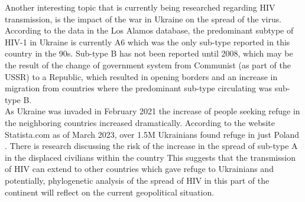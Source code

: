 Another interesting topic that is currently being researched regarding HIV transmission, is the impact of the war in Ukraine on the spread of the virus. 
According to the data in the Los Alamos database, the predominant subtype of HIV-1 in Ukraine is currently A6 which was the only sub-type reported in this country in the 90s.
Sub-type B has not been reported until 2008, which may be the result of the change of government system from Communist (as part of the USSR) to a Republic, which resulted in opening borders and an increase in migration from countries where the predominant sub-type circulating was sub-type B. \\
As Ukraine was invaded in February 2021 the increase of people seeking refuge in the neighboring countries increased dramatically. 
According to the website Statista.com as of March 2023, over 1.5M Ukrainians found refuge in just Poland \cite{ukrainian}.
There is research discussing the risk of the increase in the spread of sub-type A in the displaced civilians within the country \cite{vasylyeva_2018_molecular}
This suggests that the transmission of HIV can extend to other countries which gave refuge to Ukrainians and potentially, phylogenetic analysis of the spread of HIV in this part of the continent will reflect on the current geopolitical situation. 
